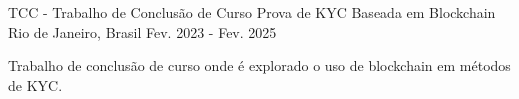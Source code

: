 

\begin{cventries}

  \cventry
    {TCC - Trabalho de Conclusão de Curso} %
    {Prova de KYC Baseada em Blockchain} %
    {Rio de Janeiro, Brasil} %
    {Fev. 2023 - Fev. 2025} %
    {
      \begin{cvitems} %
        \item {Trabalho de conclusão de curso onde é explorado o uso de blockchain em métodos de KYC.}
      \end{cvitems}
    }

\end{cventries}
